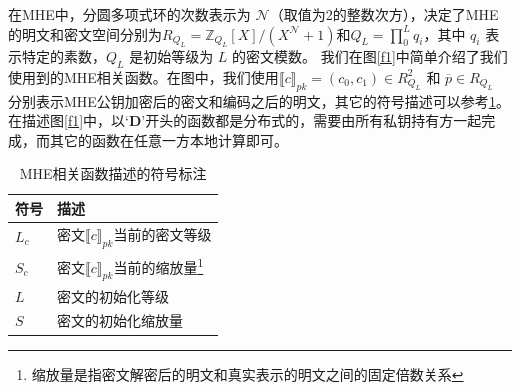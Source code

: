 在MHE中，分圆多项式环的次数表示为 $\mathcal{N}$（取值为2的整数次方），决定了MHE的明文和密文空间分别为$R_{Q_{L}}=\mathbb{Z}_{Q_{L}}[X]/(X^{\mathcal{N}}+1)$和$Q_{L}=\prod_{0}^{L}q_i$，其中 $q_i$ 表示特定的素数，$Q_L$ 是初始等级为 $L$ 的密文模数。
我们在图\ref{f1}中简单介绍了我们使用到的MHE相关函数。在图中，我们使用$\llbracket c\rrbracket_{pk}=(c_0,c_1)\in R^2_{Q_{L}}$ 和 $\overline{p}\in R_{Q_{L}}$ 分别表示MHE公钥加密后的密文和编码之后的明文，其它的符号描述可以参考\ref{tab:symbol}。
在描述图\ref{f1}中，以$‘\textbf{D}’$开头的函数都是分布式的，需要由所有私钥持有方一起完成，而其它的函数在任意一方本地计算即可。

\begin{table}[htbp]
	\centering
	\begin{minipage}[t]{0.6\linewidth}
		\caption{MHE相关函数描述的符号标注}
		\label{tab:symbol}
		\begin{tabular*}{\linewidth}{lp{10cm}}
			\toprule[1.5pt]
			{\hei 符号} & {\hei 描述}\\
			\midrule[1pt]
			$L_c$ & 密文$\llbracket c\rrbracket_{pk}$当前的密文等级 \\ 
			$S_c$ & 密文$\llbracket c\rrbracket_{pk}$当前的缩放量\footnote{缩放量是指密文解密后的明文和真实表示的明文之间的固定倍数关系} \\
			$L$ & 密文的初始化等级\\
			$S$ & 密文的初始化缩放量\\
			\bottomrule[1.5pt]
		\end{tabular*}
	\end{minipage}
\end{table}


